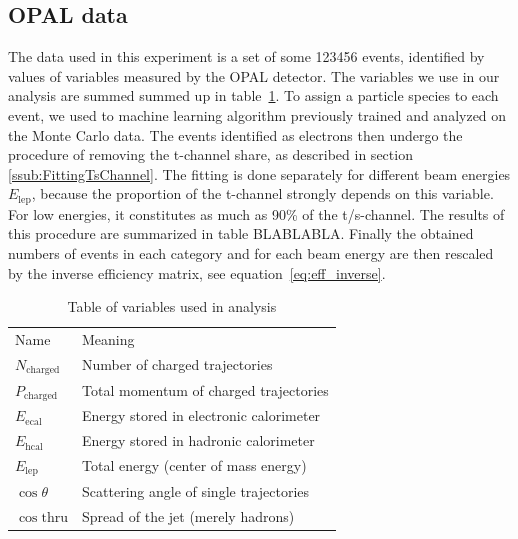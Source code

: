 \subsection{OPAL data}
\label{sub:opal_data}
The data used in this experiment is a set of some 123456 events, identified by 
values of variables measured by the OPAL detector. The variables we use in our 
analysis are summed summed up in table~\ref{tab:vars}. To assign a particle species 
to each event, we used to machine learning algorithm previously trained and analyzed 
on the Monte Carlo data. The events identified as electrons then undergo the procedure 
of removing the t-channel share, as described in section \ref{ssub:FittingTsChannel}.
The fitting is done separately for different beam energies $E_\mathrm{lep}$, because 
the proportion of the t-channel strongly depends on this variable. 
For low energies, it constitutes as much as 90\% of the t/s-channel.
The results of this procedure are summarized in table BLABLABLA. 
Finally the obtained numbers of events in each category and for each beam energy 
are then rescaled by the inverse efficiency matrix, see equation~\eqref{eq:eff_inverse}.
\begin{table}[htpb]
    \centering
    \caption{Table of variables used in analysis}
    \label{tab:vars}
    \begin{tabular}{l|l}
  \rowcolor{LightCyan} Name & Meaning \\ 
    $N_{\mathrm{charged} }$ & Number of charged trajectories \\
    $P_{\mathrm{charged} }$ & Total momentum of charged trajectories \\
    $E_{\mathrm{ecal}}$ & Energy stored in electronic calorimeter \\
    $E_{\mathrm{hcal}}$ & Energy stored in hadronic calorimeter \\
    $E_{\mathrm{lep}}$ & Total energy (center of mass energy) \\
    $\cos\theta$ & Scattering angle of single trajectories \\
    $\cos\mathrm{thru} $ & Spread of the jet (merely hadrons)\\
    \end{tabular}
\end{table}


